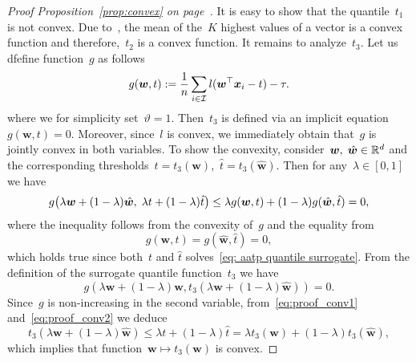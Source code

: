 \propconvex*
\begin{proof}[Proof Proposition~\ref{prop:convex} on page~\pageref{prop:convex}]
  It is easy to show that the quantile~$t_1$ is not convex. Due to~\cite{lapin2015top}, the mean of the~$K$ highest values of a vector is a convex function and therefore,~$t_2$ is a convex function. It remains to analyze~$t_3$. Let us dfefine function~$g$ as follows
  \begin{equation*}
    g(\bm{w},t) := \frac{1}{n} \sum_{i \in \mathcal{I}} l(\bm{w}^{\top} \bm{x}_i - t) - \tau.
  \end{equation*}
  where we for simplicity set~$\vartheta = 1.$ Then~$t_3$ is defined via an implicit equation~$g(\bm{w},t) = 0.$ Moreover, since~$l$ is convex, we immediately obtain that~$g$ is jointly convex in both variables. To show the convexity, consider~$\bm{w}, \; \hat{\bm{w}} \in \mathbb{R}^d$ and the corresponding thresholds~$t = t_3(\bm{w})$,~$\hat{t} = t_3(\hat{\bm{w}})$. Then for any~$\lambda\in[0,1]$ we have 
  \begin{equation}\label{eq:proof_conv1}
    g\Brac{\lambda \bm{w} + (1 - \lambda)\hat{\bm{w}}, \;\lambda t + (1 - \lambda)\hat{t}}
    \leq \lambda g(\bm{w}, t) + (1 - \lambda) g(\hat{\bm{w}}, \hat{t}) = 0,
  \end{equation}
  where the inequality follows from the convexity of~$g$ and the equality from
  \begin{equation*}
    g(\bm{w}, t) = g(\hat{\bm{w}}, \hat{t}) = 0,
  \end{equation*}
  which holds true since both~$t$ and $\hat{t}$ solves~\eqref{eq: aatp quantile surrogate}. From the definition of the surrogate quantile function~$t_3$ we have
  \begin{equation}\label{eq:proof_conv2}
    g(\lambda\bm{w} + (1-\lambda)\hat{\bm{w}}, t_3(\lambda\bm{w} + (1-\lambda)\hat{\bm{w}})) = 0.
  \end{equation}
  Since~$g$ is non-increasing in the second variable, from~\eqref{eq:proof_conv1} and~\eqref{eq:proof_conv2} we deduce
  \begin{equation*}
    t_3(\lambda\bm{w} + (1-\lambda)\hat{\bm{w}})
    \leq \lambda t + (1-\lambda)\hat{t}
    =   \lambda t_3(\bm{w})+(1-\lambda) t_3(\hat{\bm{w}}),
  \end{equation*}
  which implies that function~$\bm{w}\mapsto t_3(\bm{w})$ is convex.
\end{proof}

